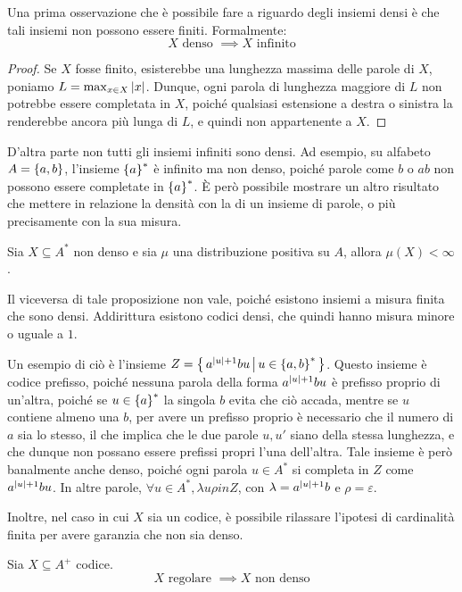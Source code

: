 Una prima osservazione che è possibile fare a riguardo degli insiemi densi è che tali insiemi non possono essere finiti.
Formalmente:
\[X \text{ denso } \implies X \text{ infinito}\]
\begin{proof}
  Se \(X\) fosse finito, esisterebbe una lunghezza massima delle parole di \(X\), poniamo \(L = \max_{x \in X} \left|x\right|\).
  Dunque, ogni parola di lunghezza maggiore di \(L\) non potrebbe essere completata in \(X\), poiché qualsiasi estensione a destra o sinistra la renderebbe ancora più lunga di \(L\), e quindi non appartenente a \(X\).
\end{proof}

D'altra parte non tutti gli insiemi infiniti sono densi. Ad esempio, su alfabeto \(A = \set{a,b}\), l'insieme \(\set{a}^*\) è infinito ma non denso, poiché parole come \(b\) o \(ab\) non possono essere completate in \(\set{a}^*\).
È però possibile mostrare un altro risultato che mettere in relazione la densità con la  di un insieme di parole, o più precisamente con la sua misura.

\begin{proposition}
  Sia \(X \subseteq A^*\) non denso e sia \(\mu\) una distribuzione positiva su \(A\), allora \(\mu(X) < \infty\).
\end{proposition}

Il viceversa di tale proposizione non vale, poiché esistono insiemi a misura finita che sono densi. Addirittura esistono codici densi, che quindi hanno misura minore o uguale a \(1\).

\begin{example}\label{ex:dense_code}
  Un esempio di ciò è l'insieme \(Z = \set{a^{\abs{u}+1}bu}[u \in \set{a,b}^*]\). Questo insieme è codice prefisso, poiché nessuna parola della forma \(a^{\left|u\right|+1}bu\) è prefisso proprio di un'altra,
  poiché se \(u \in \set{a}^*\) la singola \(b\) evita che ciò accada, mentre se \(u\) contiene almeno una \(b\), per avere un prefisso proprio è necessario che il numero di \(a\) sia lo stesso, il che implica che le due parole \(u, u'\) siano della stessa lunghezza, e che dunque non possano essere prefissi propri l'una dell'altra.
  Tale insieme è però banalmente anche denso, poiché ogni parola \(u \in A^*\) si completa in \(Z\) come \(a^{\left|u\right|+1}bu\). In altre parole, \(\forall u \in A^*, \lambda u \rho in Z\), con \(\lambda = a^{\left|u\right|+1}b\) e \(\rho = \varepsilon\).
\end{example}

Inoltre, nel caso in cui \(X\) sia un codice, è possibile rilassare l'ipotesi di cardinalità finita per avere garanzia che non sia denso.
\begin{proposition}
  Sia \(X \subseteq A^+\) codice.
  \[ X \text{ regolare } \implies X \text{ non denso}\]
\end{proposition}

